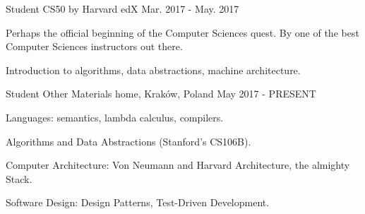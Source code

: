 \begin{cventries}
  \cventry
    {Student}
    {CS50 by Harvard}
    {edX}
	{Mar. 2017 - May. 2017} %
    {
		\begin{cvitems} %
			\item {Perhaps the official beginning of the Computer Sciences quest. By one of the best Computer Sciences instructors out there.}
			\item {Introduction to algorithms, data abstractions, machine architecture.}
		\end{cvitems}
    }

\cventry
	{Student}
	{Other Materials}
	{home, Kraków, Poland}
	{May 2017 - PRESENT}
	{
		\begin{cvitems} %
			\item {Languages: semantics, lambda calculus, compilers.}
			\item {Algorithms and Data Abstractions (Stanford's CS106B).}
			\item {Computer Architecture: Von Neumann and Harvard Architecture, the almighty Stack.}
			\item {Software Design: Design Patterns, Test-Driven Development.}
		\end{cvitems}
	}

\end{cventries}
